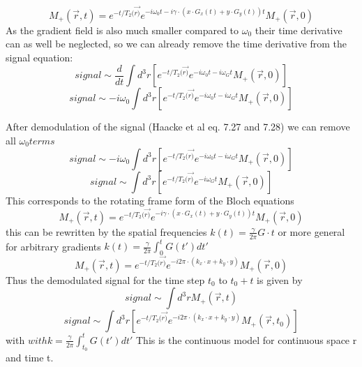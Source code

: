 \documentclass[a4paper,12pt]{extarticle}
\begin{document}
\begin{equation}
M_{+}(\vec{r},t)=e^{-t/T_{2}(\vec{r)}}e^{-i\omega_{0}t-i\gamma\cdot(x\cdot G_{x}(t)+y\cdot G_{y}(t))t}M_{+}(\vec{r},0)
\end{equation}
As the gradient field is also much smaller compared to $\omega_{0}$ their time derivative can as well be neglected, so we can already remove the time derivative from the signal equation:
\begin{equation}
signal\sim\frac{d}{dt}\int d^{3}r[e^{-t/T_{2}(\vec{r)}}e^{-i\omega_{0}t-i\omega_{G}t}M_{+}(\vec{r},0)]
\end{equation}
\begin{equation}
signal\sim-i\omega_{0}\int d^{3}r[e^{-t/T_{2}(\vec{r)}}e^{-i\omega_{0}t-i\omega_{G}t}M_{+}(\vec{r},0)]
\end{equation}

After demodulation of the signal (Haacke et al eq. 7.27 and 7.28) we can remove all $\omega_{0}terms$
\begin{equation}
signal\sim-i\omega_{0}\int d^{3}r[e^{-t/T_{2}(\vec{r)}}e^{-i\omega_{0}t-i\omega_{G}t}M_{+}(\vec{r},0)]
\end{equation}
\begin{equation}
signal\sim\int d^{3}r[e^{-t/T_{2}(\vec{r)}}e^{-i\omega_{G}t}M_{+}(\vec{r},0)]
\end{equation}
This corresponds to the rotating frame form of the Bloch equations
\begin{equation}
M_{+}(\vec{r},t)=e^{-t/T_{2}(\vec{r)}}e^{-i\gamma\cdot(x\cdot G_{x}(t)+y\cdot G_{y}(t))t}M_{+}(\vec{r},0)
\end{equation}
this can be rewritten by the spatial frequencies $k(t)=\frac{\gamma}{2\pi}G\cdot t$ or more general for arbitrary gradients $k(t)=\frac{\gamma}{2\pi}\int_{0}^{t}G(t')dt'$
\begin{equation}
M_{+}(\vec{r},t)=e^{-t/T_{2}(\vec{r)}}e^{-i2\pi\cdot(k_{x}\cdot x+k_{y}\cdot y)}M_{+}(\vec{r},0)
\end{equation}
Thus the demodulated signal for the time step $t_{0}$ to $t_{0}+t$ is given by
\begin{equation}
signal\sim\int d^{3}rM_{+}(\vec{r},t)
\end{equation}
\begin{equation}
signal\sim\int d^{3}r[e^{-t/T_{2}(\vec{r)}}e^{-i2\pi\cdot(k_{x}\cdot x+k_{y}\cdot y)}M_{+}(\vec{r},t_{0})] 
\end{equation}
with $with k=\frac{\gamma}{2\pi}\int_{t_{0}}^{t}G(t')dt'$
This is the continuous model for continuous space r and time t.



\end{document}
